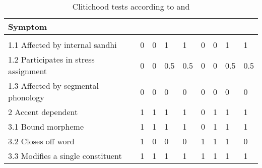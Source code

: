 \begin{table}[p]
\caption{Clitichood tests according to \citet{klavans1985} and 
	\citet{zwicky1985}}
\smaller
\begin{tabu} to \linewidth {H[9l] X[c] X[c] X[c] X[c] X[c] X[c] X[c] X[c]}
\toprule\tableheaderfont

Symptom
	& 
	& 
	& 
	& 
	& 
	& 
	& 
	& 
	\\

\toprule
\tableheaderfont{} \\
\toprule

1.1 Affected by internal sandhi
	& 0	%
	& 0	%
	& 1	%
	& 1	%
	& 0	%
	& 0	%
	& 1	%
	& 1	%
	\\ \midrule

1.2 Participates in stress assignment
	& 0	%
	& 0	%
	& 0.5	%
	& 0.5	%
	& 0	%
	& 0	%
	& 0.5	%
	& 0.5	%
	\\ \midrule

1.3 Affected by segmental phonology
	& 0	%
	& 0	%
	& 0	%
	& 0	%
	& 0	%
	& 0	%
	& 0	%
	& 0	%
	\\ \midrule

2 Accent dependent
	& 1	%
	& 1	%
	& 1	%
	& 1	%
	& 0	%
	& 1	%
	& 1	%
	& 1	%
	\\ \midrule

3.1 Bound morpheme
	& 1	%
	& 1	%
	& 1	%
	& 1	%
	& 0	%
	& 1	%
	& 1	%
	& 1	%
	\\ \midrule

3.2 Closes off word
	& 1	%
	& 0	%
	& 0	%
	& 0	%
	& 1	%
	& 1	%
	& 1	%
	& 0	%
	\\ \midrule

3.3 Modifies a single constituent
	& 1	%
	& 1	%
	& 1	%
	& 1	%
	& 1	%
	& 1	%
	& 1	%
	& 1	%
	\\ \midrule


\end{tabu}
\end{table}
